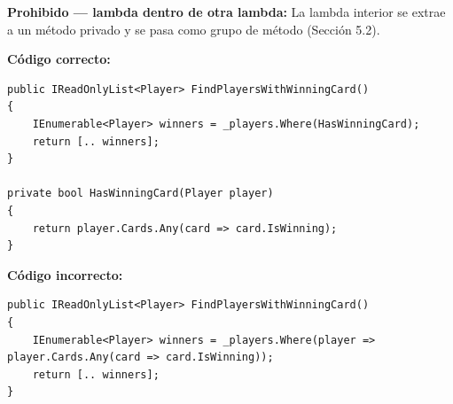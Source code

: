 \textbf{Prohibido --- lambda dentro de otra lambda:} La lambda interior se extrae a un método privado y se pasa como grupo de método (Sección 5.2).

\textbf{Código correcto:}
\begin{lstlisting}[style=csharpstyle,basicstyle=\ttfamily\scriptsize]
public IReadOnlyList<Player> FindPlayersWithWinningCard()
{
    IEnumerable<Player> winners = _players.Where(HasWinningCard);
    return [.. winners];
}

private bool HasWinningCard(Player player)
{
    return player.Cards.Any(card => card.IsWinning);
}
\end{lstlisting}

\textbf{Código incorrecto:}
\begin{lstlisting}[style=csharpstyle,basicstyle=\ttfamily\scriptsize]
public IReadOnlyList<Player> FindPlayersWithWinningCard()
{
    IEnumerable<Player> winners = _players.Where(player => player.Cards.Any(card => card.IsWinning));
    return [.. winners];
}
\end{lstlisting}
